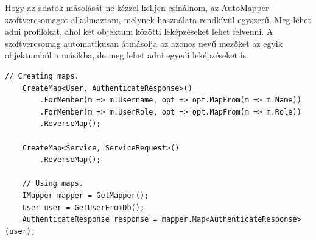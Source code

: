 Hogy az adatok másolását ne kézzel kelljen csinálnom, az AutoMapper \cite{automapper} szoftvercsomagot alkalmaztam, melynek használata rendkívül egyszerű.
Meg lehet adni profilokat, ahol két objektum közötti leképzéseket lehet felvenni. A szoftvercsomag automatikusan átmásolja az azonos nevű mezőket az egyik objektumból a másikba,
de meg lehet adni egyedi leképzéseket is.
\pagebreak
\begin{lstlisting}[style=csharp, caption=Egy példa az AutoMapper használatára.]
    // Creating maps.
    CreateMap<User, AuthenticateResponse>()
        .ForMember(m => m.Username, opt => opt.MapFrom(m => m.Name))
        .ForMember(m => m.UserRole, opt => opt.MapFrom(m => m.Role))
        .ReverseMap();

    CreateMap<Service, ServiceRequest>()
        .ReverseMap();

    // Using maps.
    IMapper mapper = GetMapper();
    User user = GetUserFromDb();
    AuthenticateResponse response = mapper.Map<AuthenticateResponse>(user);
\end{lstlisting}
